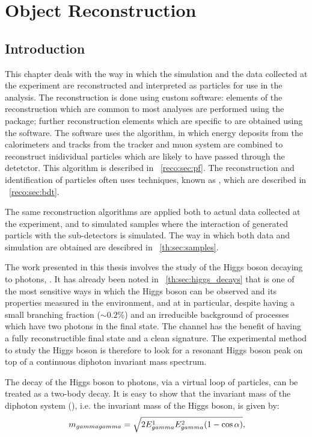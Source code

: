 \chapter{Object Reconstruction}
\label{chap:reconstruction}

\section{Introduction}

This chapter deals with the way in which the simulation and the data collected at the \CMS experiment are reconstructed and interpreted as particles for use in the \Hgg analysis. The reconstruction is done using custom software: elements of the reconstruction which are common to most analyses are performed using the \CMSSW package; further reconstruction elements which are specific to \Hgg are obtained using the \FLASHgg software. The \CMSSW software uses the \PF algorithm, in which energy deposits from the calorimeters and tracks from the tracker and muon system are combined to reconstruct inidividual particles which are likely to have passed through the detetctor. This algorithm is described in \Sec~\ref{reco:sec:pf}. The reconstruction and identification of particles often uses \MVA techniques, known as \BDT\s, which are described in \Sec~\ref{reco:sec:bdt}. 

The same reconstruction algorithms are applied both to actual data collected at the \CMS experiment, and to simulated samples where the interaction of generated particls with the \CMS sub-detectors is simulated. The way in which both data and simulation are obtained are descibred in \Sec~\ref{th:sec:samples}.

The work presented in this thesis involves the study of the Higgs boson decaying to photons, \Hgg. It has already been noted in \Sec~\ref{th:sec:higgs_decays} that \Hgg is one of the most sensitive ways in which the Higgs boson can be observed and its properties measured in the \LHC environment, and at \CMS in particular, despite having a small branching fraction ($\sim 0.2\% $) and an irreducible \SM background of \QCD processes which have two photons in the final state. The channel has the benefit of having a fully reconstructible final state and a clean signature. The experimental method to study the Higgs boson is therefore to look for a resonant Higgs boson peak on top of a continuous diphoton invariant mass spectrum.


The decay of the Higgs boson to photons, via a virtual loop of particles, can be treated as a two-body decay. It is easy to show that the invariant mass of the diphoton system (\mgg), i.e. the invariant mass of the Higgs boson, is given by:
\begin{equation}
 \,m_{gammagamma} = \sqrt{2 E_{gamma}^1 E_{gamma}^2 (1-\cos\alpha)}, 
\end{equation}

